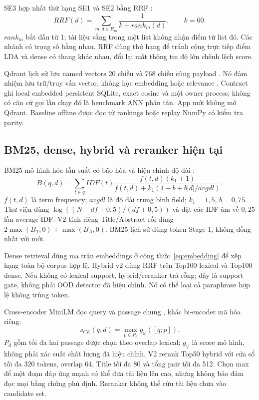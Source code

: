 SE3 hợp nhất thứ hạng SE1 và SE2 bằng RRF \cite{rrf}:
\begin{equation}\label{eq:rrf}
RRF(d)=\sum_{m:d\in R_m}\frac1{k+rank_m(d)},\qquad k=60.
\end{equation}
$rank_m$ bắt đầu từ 1; tài liệu vắng trong một list không nhận điểm từ list đó. Các nhánh có trọng số bằng nhau. RRF dùng thứ hạng để tránh cộng trực tiếp điểm LDA và dense có thang khác nhau, đổi lại mất thông tin độ lớn chênh lệch score.

Qdrant lịch sử lưu named vectors  20 chiều và  768 chiều cùng payload . Nó đảm nhiệm lưu trữ/truy vấn vector, không học embedding hoặc relevance \cite{qdrant}. Contract ghi local embedded persistent SQLite, exact cosine và một owner process; không có căn cứ gọi lần chạy đó là benchmark ANN phân tán. App mới không mở Qdrant. Baseline offline được đọc từ rankings hoặc replay NumPy có kiểm tra parity.

\subsection{BM25, dense, hybrid và reranker hiện tại}
BM25 mô hình hóa tần suất có bão hòa và hiệu chỉnh độ dài \cite{bm25}:
\begin{equation}\label{eq:bm25}
B(q,d)=\sum_{t\in q}IDF(t)\frac{f(t,d)(k_1+1)}{f(t,d)+k_1(1-b+b|d|/avgdl)}.
\end{equation}
$f(t,d)$ là term frequency; $avgdl$ là độ dài trung bình field; $k_1=1,5$, $b=0,75$. Thư viện  dùng $\log((N-df+0,5)/(df+0,5))$ và đặt các IDF âm về $0,25$ lần average IDF. V2 tính riêng Title/Abstract rồi dùng $2\max(B_T,0)+\max(B_A,0)$. BM25 lịch sử dùng token Stage 1, không đồng nhất với  mới.

Dense retrieval dùng ma trận embeddings ở công thức~\eqref{eq:embedding} để xếp hạng toàn bộ corpus hợp lệ. Hybrid v2 dùng RRF trên Top100 lexical và Top100 dense. Nếu không có lexical support, hybrid/reranker trả rỗng; đây là support gate, không phải OOD detector đã hiệu chỉnh. Nó có thể loại cả paraphrase hợp lệ không trùng token.

Cross-encoder MiniLM đọc query và passage chung \cite{reranker}, khác bi-encoder mã hóa riêng:
\begin{equation}\label{eq:rerank}
s_{CE}(q,d)=\max_{p\in P_d}g_\psi([q;p]).
\end{equation}
$P_d$ gồm tối đa hai passage được chọn theo overlap lexical; $g_\psi$ là score mô hình, không phải xác suất chất lượng đã hiệu chỉnh. V2 rerank Top50 hybrid với cửa sổ tối đa 320 tokens, overlap 64, Title tối đa 80 và tổng pair tối đa 512. Chọn max để một đoạn đáp ứng mạnh có thể đưa tài liệu lên cao, nhưng không bảo đảm đọc mọi bằng chứng phủ định. Reranker không thể cứu tài liệu chưa vào candidate set.

